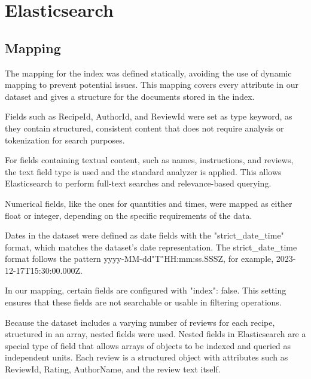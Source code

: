\section{Elasticsearch}
\subsection{Mapping}

The mapping for the index was defined statically, avoiding the use of dynamic mapping to prevent potential issues. This mapping covers every attribute in our dataset and gives a structure for the documents stored in the index.

Fields such as RecipeId, AuthorId, and ReviewId were set as type keyword, as they contain structured, consistent content that does not require analysis or tokenization for search purposes. 

For fields containing textual content, such as names, instructions, and reviews, the text field type is used and the standard analyzer is applied. This allows Elasticsearch to perform full-text searches and relevance-based querying.

Numerical fields, like the ones for quantities and times, were mapped as either float or integer, depending on the specific requirements of the data. 

Dates in the dataset were defined as date fields with the "strict\_date\_time" format, which matches the dataset’s date representation. The strict\_date\_time format follows the pattern yyyy-MM-dd"T"HH:mm:ss.SSSZ, for example, 2023-12-17T15:30:00.000Z.

In our mapping, certain fields are configured with "index": false. This setting ensures that these fields are not searchable or usable in filtering operations.

Because the dataset includes a varying number of reviews for each recipe, structured in an array, nested fields were used. Nested fields in Elasticsearch are a special type of field that allows arrays of objects to be indexed and queried as independent units. Each review is a structured object with attributes such as ReviewId, Rating, AuthorName, and the review text itself.


